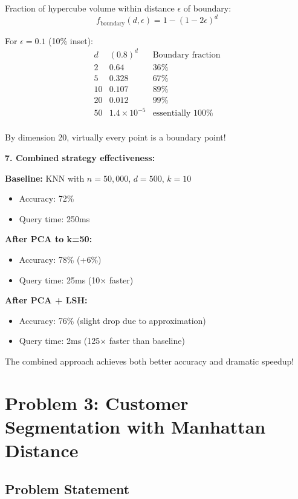 \documentclass[12pt]{article}
\begin{document}
\begin{computation}
Fraction of hypercube volume within distance \(\epsilon\) of boundary:
\[
f_{\text{boundary}}(d, \epsilon) = 1 - (1 - 2\epsilon)^d
\]

For \(\epsilon = 0.1\) (10\% inset):
\[
\begin{array}{c|c|c}
d & (0.8)^d & \text{Boundary fraction} \\
\hline
2 & 0.64 & 36\% \\
5 & 0.328 & 67\% \\
10 & 0.107 & 89\% \\
20 & 0.012 & 99\% \\
50 & 1.4 \times 10^{-5} & \text{essentially 100\%} \\
\end{array}
\]

By dimension 20, virtually every point is a boundary point!

\textbf{7. Combined strategy effectiveness:}

\textbf{Baseline:} KNN with \(n=50,000\), \(d=500\), \(k=10\)
\begin{itemize}
    \item Accuracy: 72\%
    \item Query time: 250ms
\end{itemize}

\textbf{After PCA to k=50:}
\begin{itemize}
    \item Accuracy: 78\% (+6\%)
    \item Query time: 25ms (10× faster)
\end{itemize}

\textbf{After PCA + LSH:}
\begin{itemize}
    \item Accuracy: 76\% (slight drop due to approximation)
    \item Query time: 2ms (125× faster than baseline)
\end{itemize}

The combined approach achieves both better accuracy and dramatic speedup!
\end{computation}

\newpage
\section{Problem 3: Customer Segmentation with Manhattan Distance}

\subsection{Problem Statement}
\end{document}
